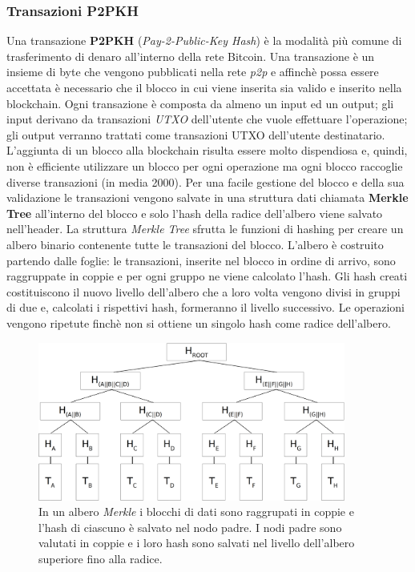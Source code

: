 \subsubsection{Transazioni P2PKH}\label{sec:transazione}
Una transazione \textbf{P2PKH} (\textit{Pay-2-Public-Key Hash}) è la modalità più comune di trasferimento di denaro all'interno della rete Bitcoin.
Una transazione è un insieme di byte che vengono pubblicati nella rete \textit{p2p} e affinchè possa essere accettata è necessario che il blocco in cui viene inserita sia valido e inserito nella blockchain.
Ogni transazione è composta da almeno un input ed un output; gli input derivano da transazioni \textit{UTXO} dell'utente che vuole effettuare l'operazione; gli output verranno trattati come transazioni UTXO dell'utente destinatario.\newline
L'aggiunta di un blocco alla blockchain risulta essere molto dispendiosa e, quindi, non è efficiente utilizzare un blocco per ogni operazione ma ogni blocco raccoglie diverse transazioni (in media 2000). Per una facile gestione del blocco e della sua validazione le transazioni vengono salvate in una struttura dati chiamata \textbf{Merkle Tree} all'interno del blocco e solo l'hash della radice dell'albero viene salvato nell'header.\newline
La struttura \textit{Merkle Tree} sfrutta le funzioni di hashing per creare un albero binario contenente tutte le transazioni del blocco.\newline
L'albero è costruito partendo dalle foglie: le transazioni, inserite nel blocco in ordine di arrivo, sono raggruppate in coppie e per ogni gruppo ne viene calcolato l'hash. Gli hash creati costituiscono il nuovo livello dell'albero che a loro volta vengono divisi in gruppi di due e, calcolati i rispettivi hash, formeranno il livello successivo.
Le operazioni vengono ripetute finchè non si ottiene un singolo hash come radice dell'albero.\newline
\begin{figure}
    \centering
    \includegraphics[width=0.9\textwidth]{./images/merkle.png}
    \caption{In un albero \textit{Merkle} i blocchi di dati sono raggrupati in coppie e l'hash di ciascuno è salvato nel nodo padre. I nodi padre sono valutati in coppie e i loro hash sono salvati nel livello dell'albero superiore fino alla radice.}
    \label{fig:merkle}
\end{figure}
